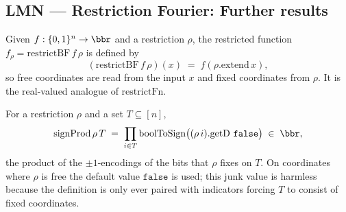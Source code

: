 \subsection*{LMN --- Restriction Fourier: Further results}

\begin{definition}
\label{RestrictionFourier.restrictBF}
\leanok
{}
Given $f : \{0,1\}^n \to \bbr$ and a restriction $\rho$, the restricted function
$f_\rho = \mathrm{restrictBF}\,f\,\rho$ is defined by
\[
  (\mathrm{restrictBF}\,f\,\rho)(x) \;=\; f(\rho.\mathrm{extend}\,x),
\]
so free coordinates are read from the input $x$ and fixed coordinates from $\rho$. It is
the real-valued analogue of $\mathrm{restrictFn}$.
\end{definition}

\begin{definition}
\label{RestrictionFourier.signProd}
\leanok
{}
For a restriction $\rho$ and a set $T \subseteq [n]$,
\[
  \mathrm{signProd}\,\rho\,T \;=\; \prod_{i \in T} \mathrm{boolToSign}\bigl((\rho\,i).\mathrm{getD}\ \mathtt{false}\bigr)
  \;\in\; \bbr,
\]
the product of the $\pm1$-encodings of the bits that $\rho$ fixes on $T$. On coordinates
where $\rho$ is free the default value $\mathtt{false}$ is used; this junk value is
harmless because the definition is only ever paired with indicators forcing $T$ to consist
of fixed coordinates.
\end{definition}

